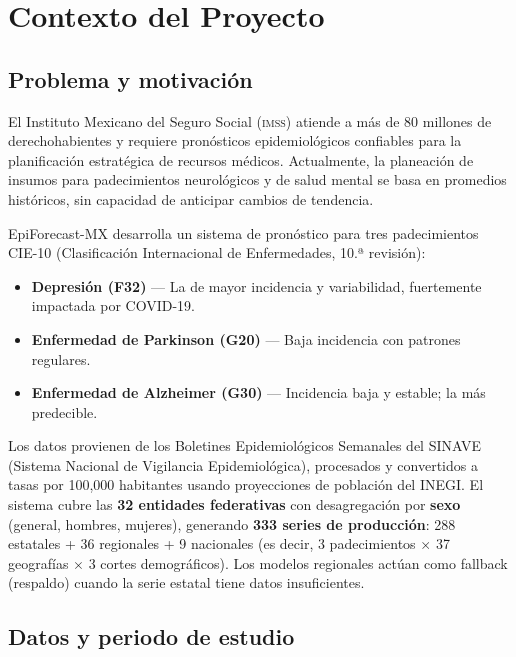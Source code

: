 \documentclass[12pt, letterpaper]{article}
\newcommand{\imss}{\textsc{imss}}
\begin{document}
\section{Contexto del Proyecto}\label{sec:contexto}

\subsection{Problema y motivación}

El Instituto Mexicano del Seguro Social (\imss{}) atiende a más de 80 millones de derechohabientes y requiere pronósticos epidemiológicos confiables para la planificación estratégica de recursos médicos. Actualmente, la planeación de insumos para padecimientos neurológicos y de salud mental se basa en promedios históricos, sin capacidad de anticipar cambios de tendencia.

EpiForecast-MX desarrolla un sistema de pronóstico para tres padecimientos CIE-10 (Clasificación Internacional de Enfermedades, 10.ª revisión):
\begin{itemize}[noitemsep]
    \item \textbf{Depresión (F32)} --- La de mayor incidencia y variabilidad, fuertemente impactada por COVID-19.
    \item \textbf{Enfermedad de Parkinson (G20)} --- Baja incidencia con patrones regulares.
    \item \textbf{Enfermedad de Alzheimer (G30)} --- Incidencia baja y estable; la más predecible.
\end{itemize}

Los datos provienen de los Boletines Epidemiológicos Semanales del SINAVE (Sistema Nacional de Vigilancia Epidemiológica), procesados y convertidos a tasas por 100,000 habitantes usando proyecciones de población del INEGI. El sistema cubre las \textbf{32 entidades federativas} con desagregación por \textbf{sexo} (general, hombres, mujeres), generando \textbf{333 series de producción}: 288 estatales + 36 regionales + 9 nacionales (es decir, 3 padecimientos $\times$ 37 geografías $\times$ 3 cortes demográficos). Los modelos regionales actúan como fallback (respaldo) cuando la serie estatal tiene datos insuficientes.

\subsection{Datos y periodo de estudio}
\end{document}
